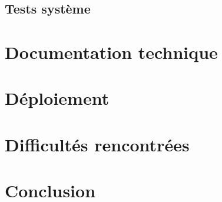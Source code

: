 \subsection{Tests système}

\section{Documentation technique}

\section{Déploiement}

\section{Difficultés rencontrées}

\section{Conclusion}